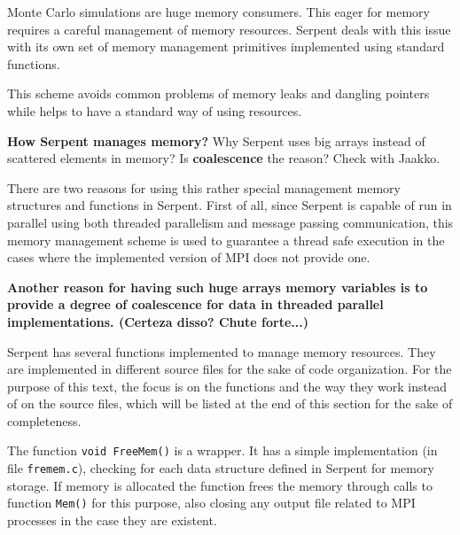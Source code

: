 \documentclass[twoside,a4paper,12pt,english]{anstrans}
\begin{document}
Monte Carlo simulations are huge memory consumers. This eager for memory requires a careful
management of memory resources. Serpent deals with this issue with its own set of memory
management primitives implemented using standard functions.

This scheme avoids common problems of memory leaks and dangling pointers while helps to
have a standard way of using resources.

\textbf{How Serpent manages memory?}
Why Serpent uses big arrays instead of scattered elements in memory?
Is \textbf{coalescence} the reason? Check with Jaakko.

There are two reasons for using this rather special management memory
structures and functions in Serpent. First of all, since Serpent is
capable of run in parallel using both threaded parallelism and
message passing communication, this memory management scheme is
used to guarantee a thread safe execution in the cases where
the implemented version of MPI does not provide one.

\textbf{Another reason for having such huge arrays memory variables is to
provide a degree of coalescence for data in threaded parallel implementations.
(Certeza disso? Chute forte...)}

%

Serpent has several functions implemented to manage memory resources. They are implemented in different
source files for the sake of code organization. For the purpose of this text, the focus is on the functions
and the way they work instead of on the source files, which will be listed at the end of this section for
the sake of completeness.

The function \texttt{void FreeMem()} is a wrapper. It has a simple implementation (in file \texttt{fremem.c}), checking
for each data structure defined in Serpent for memory storage. If memory is allocated the function frees the memory
through calls to function \texttt{Mem()} for this purpose, also closing any output file related to MPI processes
in the case they are existent.
\end{document}
